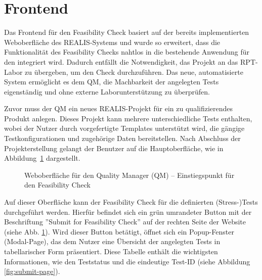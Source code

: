 \section{Frontend}
Das Frontend für den Feasibility Check basiert auf der bereits implementierten Web\-oberfläche des \gls{REALIS}-Systems und wurde so erweitert, dass die Funktionalität des Feasibility Checks nahtlos in die bestehende Anwendung für den  integriert wird. Dadurch entfällt die Notwendigkeit, das Projekt an das \gls{RPT}-Labor zu übergeben, um den Check durchzuführen. Das neue, automatisierte System ermöglicht es dem \gls{QM}, die Machbarkeit der angelegten Tests eigenständig und ohne externe Laborunterstützung zu überprüfen.

Zuvor muss der \gls{QM} ein neues \gls{REALIS}-Projekt für ein zu qualifizierendes Produkt anlegen. Dieses Projekt kann mehrere unterschiedliche Tests enthalten, wobei der Nutzer durch vorgefertigte Templates unterstützt wird, die gängige Testkonfigurationen und zugehörige Daten bereitstellen. Nach Abschluss der Projekterstellung gelangt der Benutzer auf die Hauptoberfläche, wie in Abbildung~\ref{fig:whole-page} dargestellt.

\begin{figure}[!htbp] 
    \centering 
    \caption{Weboberfläche für den Quality Manager (QM) – Einstiegspunkt für den Feasibility Check} 
    \label{fig:whole-page} 
\end{figure}

Auf dieser Oberfläche kann der Feasibility Check für die definierten (Stress-)Tests durchgeführt werden. Hierfür befindet sich ein grün umrandeter Button mit der Beschriftung ''Submit for Feasibility Check'' auf der rechten Seite der Website (siehe Abb. \ref{fig:whole-page}). Wird dieser Button betätigt, öffnet sich ein Popup-Fenster (Modal-Page), das dem Nutzer eine Übersicht der angelegten Tests in tabellarischer Form präsentiert. Diese Tabelle enthält die wichtigsten Informationen, wie den Teststatus und die eindeutige Test-ID (siehe Abbildung \ref{fig:submit-page}).

